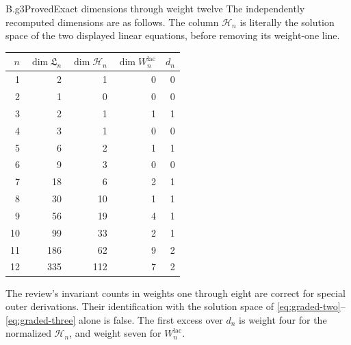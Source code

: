 \begin{claim}{B.g3}{Proved}{Exact dimensions through weight twelve}
The independently recomputed dimensions are as follows.  The column
$\mathcal H_n$ is literally the solution space of the two displayed
linear equations, before removing its weight-one line.
\begin{center}
\begin{tabular}{r|rrrr}
$n$&$\dim\mathfrak L_n$&$\dim\mathcal H_n$&$\dim W^{\mathrm{lac}}_n$&$d_n$\\\hline
1&2&1&0&0\\
2&1&0&0&0\\
3&2&1&1&1\\
4&3&1&0&0\\
5&6&2&1&1\\
6&9&3&0&0\\
7&18&6&2&1\\
8&30&10&1&1\\
9&56&19&4&1\\
10&99&33&2&1\\
11&186&62&9&2\\
12&335&112&7&2
\end{tabular}
\end{center}
The review's invariant counts in weights one through eight are correct
for special outer derivations.  Their identification with the solution
space of \eqref{eq:graded-two}--\eqref{eq:graded-three} alone is false.
The first excess over $d_n$ is weight four for the normalized
$\mathcal H_n$, and weight seven for $W^{\mathrm{lac}}_n$.
\end{claim}

